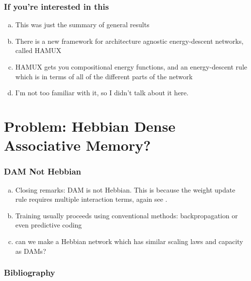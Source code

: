 \documentclass{beamer}
\begin{document}
\begin{frame}
\frametitle{If you're interested in this}

\begin{enumerate}[(a)]
    \item This was just the summary of general results
    \item There is a new framework for architecture agnostic energy-descent
    networks, called HAMUX \parencite{krotov_hierarchical_2021}
    \item HAMUX gets you compositional energy functions, and an energy-descent
    rule which is in terms of all of the different parts of the network
    \item I'm not too familiar with it, so I didn't talk about it here.
\end{enumerate}

\end{frame}

\section{Problem: Hebbian Dense Associative Memory?}
\begin{frame}
\frametitle{DAM Not Hebbian}
    \begin{enumerate}[(a)]
        \item Closing remarks: DAM is not Hebbian. This is because the weight update
        rule requires multiple interaction terms, again see \textcite{kelly_memory_2017}.

        \item Training usually proceeds using conventional methods: backpropagation or 
        even predictive coding \parencites{millidge_predictive_2022,salvatori_associative_2021}

        \item can we make a Hebbian network which 
        has similar scaling laws and capacity as DAMs?
    \end{enumerate}
\end{frame}

\begin{frame}[allowframebreaks]
    \frametitle{Bibliography}
    \printbibliography
\end{frame}
\end{document}
